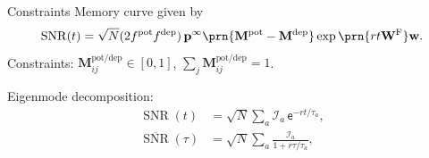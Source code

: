 \documentclass{beamer}%
\newcommand{\pr}{\mathbf{p}}
\newcommand{\eq}{\pr^\infty}
\newcommand{\w}{\mathbf{w}}
\newcommand{\W}{\mathbf{W}}
\newcommand{\frg}{\W^\mathrm{F}}
\newcommand{\M}{\mathbf{M}}
\newcommand{\syn}{\vec{w}}
\newcommand{\synid}{\syn_\text{ideal}}
\DeclareMathOperator{\SNR}{SNR}
\DeclareMathOperator{\snr}{SNR}
\newcommand{\snrb}{\overline{\snr}}
\newcommand{\pot}{^{\text{pot}}}
\newcommand{\dep}{^{\text{dep}}}
\newcommand{\potdep}{^{\text{pot/dep}}}
\newcommand{\initial}{\mathcal{I}}
\renewcommand{\e}{\mathsf{e}}
\begin{document}
%
%

\begin{frame}{Constraints}
%
 Memory curve given by
 \begin{equation*}
   \snr(t) =
      \sqrt{N}(2f\pot f\dep)\,
      \eq \prn{\M\pot-\M\dep}      \exp\prn{rt\frg}\w.
 \end{equation*}
 Constraints: \qquad $\M\potdep_{ij}\in[0,1]$, \qquad $\sum_j\M\potdep_{ij}=1$.

 \vp Eigenmode decomposition:
 \begin{equation*}
 \begin{aligned}
   \snr(t) &= \sqrt{N}\sum_a \initial_a \,\e^{-rt/\tau_a}, \\
   \snrb(\tau) &= \sqrt{N}\sum_a \frac{\initial_a }{1+r\tau/\tau_a}, \\
 \end{aligned}
 \end{equation*}
%
\end{frame}
\end{document}

